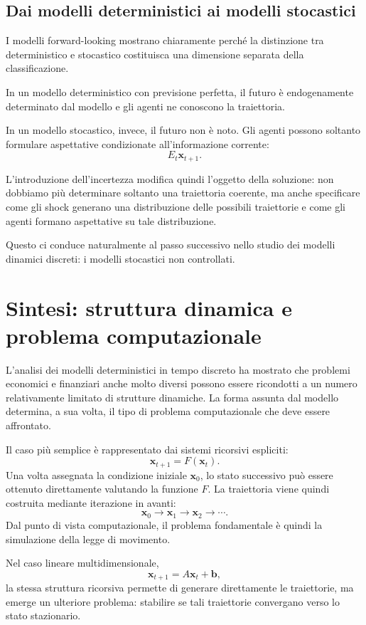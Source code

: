 \documentclass{book}
\begin{document}
\subsection{Dai modelli deterministici ai modelli stocastici}

I modelli forward-looking mostrano chiaramente perché la distinzione tra
deterministico e stocastico costituisca una dimensione separata della
classificazione.

In un modello deterministico con previsione perfetta, il futuro è
endogenamente determinato dal modello e gli agenti ne conoscono la
traiettoria.

In un modello stocastico, invece, il futuro non è noto. Gli agenti possono
soltanto formulare aspettative condizionate all'informazione corrente:
\[
E_t\mathbf{x}_{t+1}.
\]

L'introduzione dell'incertezza modifica quindi l'oggetto della soluzione:
non dobbiamo più determinare soltanto una traiettoria coerente, ma anche
specificare come gli shock generano una distribuzione delle possibili
traiettorie e come gli agenti formano aspettative su tale distribuzione.

Questo ci conduce naturalmente al passo successivo nello studio dei
modelli dinamici discreti: i modelli stocastici non controllati.

\section{Sintesi: struttura dinamica e problema computazionale}

L'analisi dei modelli deterministici in tempo discreto ha mostrato che
problemi economici e finanziari anche molto diversi possono essere
ricondotti a un numero relativamente limitato di strutture dinamiche.
La forma assunta dal modello determina, a sua volta, il tipo di problema
computazionale che deve essere affrontato.

Il caso più semplice è rappresentato dai sistemi ricorsivi espliciti:
\[
\mathbf{x}_{t+1}=F(\mathbf{x}_t).
\]
Una volta assegnata la condizione iniziale $\mathbf{x}_0$, lo stato
successivo può essere ottenuto direttamente valutando la funzione
$F$. La traiettoria viene quindi costruita mediante iterazione in avanti:
\[
\mathbf{x}_0
\rightarrow
\mathbf{x}_1
\rightarrow
\mathbf{x}_2
\rightarrow
\cdots.
\]
Dal punto di vista computazionale, il problema fondamentale è quindi
la simulazione della legge di movimento.

Nel caso lineare multidimensionale,
\[
\mathbf{x}_{t+1}=A\mathbf{x}_t+\mathbf{b},
\]
la stessa struttura ricorsiva permette di generare direttamente le
traiettorie, ma emerge un ulteriore problema: stabilire se tali
traiettorie convergano verso lo stato stazionario.
\end{document}
